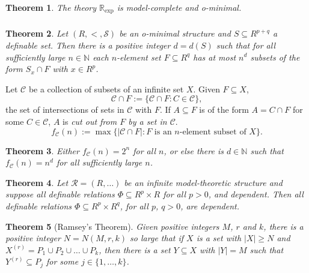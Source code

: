 \documentclass{amsart}
\newtheorem{theorem}{Theorem}[section]
\theoremstyle{definition}
\numberwithin{equation}{section}
\begin{document}
\begin{theorem}
    The theory $\mathbb{R}_{\exp}$ is model-complete and o-minimal.
\end{theorem}

\subsubsection{}
\begin{theorem}
  Let $(R,<,\mathcal{S})$ be an o-minimal structure and 
  $S \subseteq R^{p+q}$ a definable set.
  Then there is a positive integer $d = d(S)$ such that
  for all sufficiently large $n\in\mathbb{N}$
  each $n$-element set $F \subseteq R^q$ has at most $n^d$ subsets of the form $S_x \cap F$ with $x \in R^p$.
\end{theorem}

Let $\mathcal{C}$ be a collection of subsets of an infinite set $X$.
Given $F \subseteq X$,
  \[
    \mathcal{C}\cap F := \{\mathcal{C}\cap F:C \in \mathcal{C}\},
  \]
the set of intersections of sets in $\mathcal{C}$ with $F$.
  If $A \subseteq F$ is of the form $A = C\cap F$ for some $C\in \mathcal{C}$,
  $A$ is \emph{cut out from $F$ by a set in $\mathcal{C}$}.
  \[
    f_{\mathcal{C}}(n):=\max\{|\mathcal{C}\cap F|:F\text{ is an $n$-element subset of $X$}\}.
  \]

\begin{theorem}
  Either $f_{\mathcal{C}}(n) = 2^n$ for all $n$,
  or else there is $d\in \mathbb{N}$ such that 
  $f_{\mathcal{C}}(n) = n^d$ for all sufficiently large $n$.
\end{theorem}

\begin{theorem}
  Let $\mathcal{R} = (R,\dots)$ be an infinite model-theoretic structure and suppose 
  all definable relations $\Phi \subseteq R^p \times R$ for all $p > 0$, and dependent.
  Then all definable relations $\Phi \subseteq R^p \times R^q$,
  for all $p$, $q > 0$, are dependent.
\end{theorem}

\begin{theorem}[Ramsey's Theorem]
  Given positive integers $M$, $r$ and $k$,
  there is a positive integer $N = N(M,r,k)$ so large that 
  if $X$ is a set with $|X| \ge N$ and
  $X^{(r)} = P_1 \cup P_2 \cup \dots \cup P_k$,
  then there is a set $Y \subseteq X$ with $|Y|=M$ such that 
  $Y^{(r)} \subseteq P_j$ for some $j\in \{1,\dots,k\}$.
\end{theorem}
\end{document}
